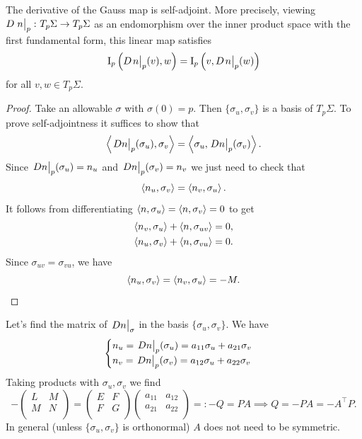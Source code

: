 \documentclass[a4paper]{article}
\begin{document}
\begin{lemma}
	The derivative of the Gauss map is self-adjoint.
	More precisely, viewing \( D \eval{n}_p \colon T_p \Sigma \to T_p \Sigma \) as an endomorphism over the inner product space with the first fundamental form, this linear map satisfies
	\[
		\Iff_p\qty(D \teval{n}{p}(v), w) = \Iff_p\qty(v, D \teval{n}{p}(w))
	\]
	for all \( v, w \in T_p \Sigma \).
\end{lemma}

\begin{proof}
	Take an allowable $\sigma$ with $\sigma(0)=p$. Then $ \{\sigma_u,\sigma_v\} $ is a basis of $ T_p\Sigma $. To prove self-adjointness it suffices to show that 
	\[
		\inner{\teval{Dn}p(\sigma_u),\sigma_v} = \inner{\sigma_u,\teval{Dn}p (\sigma_v)}. 
	\]
	Since $ \teval{Dn}p(\sigma_u) = n_u $ and $ \teval{Dn}p (\sigma_v) = n_v $ we just need to check that
	\[
		\left\langle{n_u,\sigma_v}\right\rangle = \left\langle{n_v,\sigma_u}\right\rangle. 
	\]
	It follows from differentiating $ \left\langle{n,\sigma_u}\right\rangle = \left\langle{n,\sigma_v}\right\rangle = 0 $ to get 
	\begin{align*}
		\left\langle{n_v,\sigma_u}\right\rangle + \left\langle{n,\sigma_{uv}}\right\rangle = 0,\\ 
		\left\langle{n_u,\sigma_v}\right\rangle + \left\langle{n,\sigma_{vu}}\right\rangle = 0.
	\end{align*}
	Since $ \sigma_{uv} = \sigma_{vu} $, we have 
	\[
		\left\langle{n_u,\sigma_v}\right\rangle=\left\langle{n_v,\sigma_u}\right\rangle=-M. \qedhere
	\]
\end{proof}

Let's find the matrix of $ \teval{Dn}{\sigma} $ in the basis $ \{\sigma_u,\sigma_v\} $. We have 
\[
	\begin{cases}
	n_u = \teval{D n}{p} (\sigma_u) = a_{11} \sigma_u + a_{21} \sigma_v\\ 
	n_v = \teval{D n}p(\sigma_v) = a_{12} \sigma_u + a_{22} \sigma_v
	\end{cases} 
\]
Taking products with $ \sigma_u, \sigma_v $ we find 
\[
	- \begin{pmatrix}
		L  &  M \\
		M &  N \\
	\end{pmatrix} = \begin{pmatrix}
		E &  F \\
		F &  G \\
	\end{pmatrix} \begin{pmatrix}
		a_{11} &  a_{12} \\
		a_{21} &  a_{22} \\
	\end{pmatrix} =: -Q = PA \implies Q = -PA = -A ^\top P. 
\]
In general (unless $ \{\sigma_u,\sigma_v\} $ is orthonormal) $A$ does not need to be symmetric.
\end{document}
